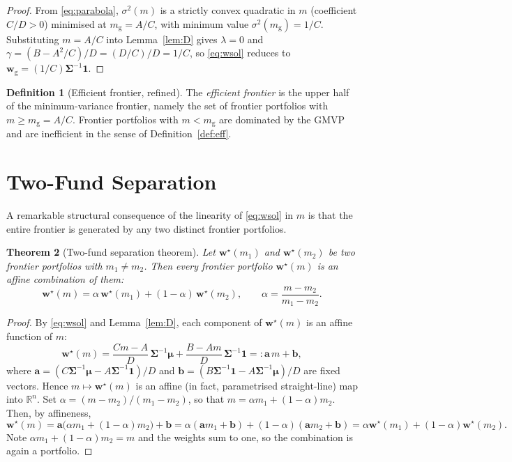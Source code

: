 \documentclass[11pt]{article}
\theoremstyle{definition}
\newtheorem{definition}{Definition}[section]
\theoremstyle{plain}
\newtheorem{theorem}[definition]{Theorem}
\newcommand{\R}{\mathbb{R}}
\newcommand{\one}{\mathbf{1}}
\newcommand{\bw}{\bm{w}}
\newcommand{\bmu}{\bm{\mu}}
\newcommand{\bSigma}{\bm{\Sigma}}
\begin{document}
\begin{proof}
From \eqref{eq:parabola}, $\sigma^2(m)$ is a strictly convex quadratic in $m$
(coefficient $C/D > 0$) minimised at $m_{\mathrm{g}} = A/C$, with minimum value
$\sigma^2(m_{\mathrm{g}}) = 1/C$. Substituting $m = A/C$ into
Lemma~\ref{lem:D} gives $\lambda = 0$ and $\gamma = (B - A^2/C)/D = (D/C)/D
= 1/C$, so \eqref{eq:wsol} reduces to $\bw_{\mathrm{g}} = (1/C)\bSigma^{-1}\one$.
\end{proof}

\begin{definition}[Efficient frontier, refined]
The \emph{efficient frontier} is the upper half of the minimum-variance
frontier, namely the set of frontier portfolios with $m \ge m_{\mathrm{g}}
= A/C$. Frontier portfolios with $m < m_{\mathrm{g}}$ are dominated by the GMVP
and are inefficient in the sense of Definition~\ref{def:eff}.
\end{definition}

\section{Two-Fund Separation}

A remarkable structural consequence of the linearity of \eqref{eq:wsol} in $m$
is that the entire frontier is generated by any two distinct frontier
portfolios.

\begin{theorem}[Two-fund separation theorem]\label{thm:twofund}
Let $\bw^\star(m_1)$ and $\bw^\star(m_2)$ be two frontier portfolios with
$m_1 \ne m_2$. Then every frontier portfolio $\bw^\star(m)$ is an affine
combination of them:
\[
\bw^\star(m) = \alpha\, \bw^\star(m_1) + (1-\alpha)\, \bw^\star(m_2),
\qquad
\alpha = \frac{m - m_2}{m_1 - m_2}.
\]
\end{theorem}

\begin{proof}
By \eqref{eq:wsol} and Lemma~\ref{lem:D}, each component of $\bw^\star(m)$ is an
affine function of $m$:
\[
\bw^\star(m)
= \frac{Cm - A}{D}\,\bSigma^{-1}\bmu + \frac{B - Am}{D}\,\bSigma^{-1}\one
=: \bm{a}\, m + \bm{b},
\]
where $\bm{a} = (C\bSigma^{-1}\bmu - A\bSigma^{-1}\one)/D$ and
$\bm{b} = (B\bSigma^{-1}\one - A\bSigma^{-1}\bmu)/D$ are fixed vectors. Hence
$m \mapsto \bw^\star(m)$ is an affine (in fact, parametrised straight-line) map
into $\R^n$. Set $\alpha = (m - m_2)/(m_1 - m_2)$, so that
$m = \alpha m_1 + (1-\alpha)m_2$. Then, by affineness,
\[
\bw^\star(m) = \bm{a}\big(\alpha m_1 + (1-\alpha)m_2\big) + \bm{b}
= \alpha(\bm{a}m_1 + \bm{b}) + (1-\alpha)(\bm{a}m_2 + \bm{b})
= \alpha \bw^\star(m_1) + (1-\alpha)\bw^\star(m_2).
\]
Note $\alpha m_1 + (1-\alpha)m_2 = m$ and the weights sum to one, so the
combination is again a portfolio.
\end{proof}
\end{document}
